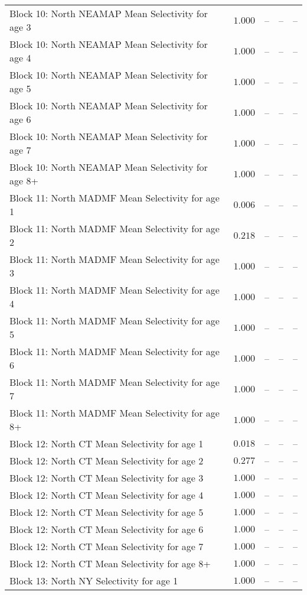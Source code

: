 \documentclass[
]{article}
\begin{document}
\begin{landscape}
\begin{longtable}[t]{lrrrr}
Block 10: North NEAMAP Mean Selectivity for age 3 & $1.000$ & -- & -- & --\\
Block 10: North NEAMAP Mean Selectivity for age 4 & $1.000$ & -- & -- & --\\
Block 10: North NEAMAP Mean Selectivity for age 5 & $1.000$ & -- & -- & --\\
Block 10: North NEAMAP Mean Selectivity for age 6 & $1.000$ & -- & -- & --\\
\addlinespace
Block 10: North NEAMAP Mean Selectivity for age 7 & $1.000$ & -- & -- & --\\
Block 10: North NEAMAP Mean Selectivity for age 8+ & $1.000$ & -- & -- & --\\
Block 11: North MADMF Mean Selectivity for age 1 & $0.006$ & -- & -- & --\\
Block 11: North MADMF Mean Selectivity for age 2 & $0.218$ & -- & -- & --\\
Block 11: North MADMF Mean Selectivity for age 3 & $1.000$ & -- & -- & --\\
\addlinespace
Block 11: North MADMF Mean Selectivity for age 4 & $1.000$ & -- & -- & --\\
Block 11: North MADMF Mean Selectivity for age 5 & $1.000$ & -- & -- & --\\
Block 11: North MADMF Mean Selectivity for age 6 & $1.000$ & -- & -- & --\\
Block 11: North MADMF Mean Selectivity for age 7 & $1.000$ & -- & -- & --\\
Block 11: North MADMF Mean Selectivity for age 8+ & $1.000$ & -- & -- & --\\
\addlinespace
Block 12: North CT Mean Selectivity for age 1 & $0.018$ & -- & -- & --\\
Block 12: North CT Mean Selectivity for age 2 & $0.277$ & -- & -- & --\\
Block 12: North CT Mean Selectivity for age 3 & $1.000$ & -- & -- & --\\
Block 12: North CT Mean Selectivity for age 4 & $1.000$ & -- & -- & --\\
Block 12: North CT Mean Selectivity for age 5 & $1.000$ & -- & -- & --\\
\addlinespace
Block 12: North CT Mean Selectivity for age 6 & $1.000$ & -- & -- & --\\
Block 12: North CT Mean Selectivity for age 7 & $1.000$ & -- & -- & --\\
Block 12: North CT Mean Selectivity for age 8+ & $1.000$ & -- & -- & --\\
Block 13: North NY Selectivity for age 1 & $1.000$ & -- & -- & --\\

\end{longtable}
\end{landscape}
\end{document}
